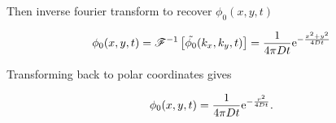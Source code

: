 Then inverse fourier transform to recover $\phi_0(x,y,t)$

\begin{equation}
  \phi_0(x,y,t) = \mathscr{F}^{-1}\left[\tilde{\phi_0}(k_x,k_y,t)\right] = \frac{1}{4\pi Dt}\mathrm{e}^{-\frac{x^2 + y^2}{4Dt}} \\
\end{equation}

Transforming back to polar coordinates gives

\begin{equation}
  \phi_0(x,y,t) = \frac{1}{4\pi Dt}\mathrm{e}^{-\frac{r^2}{4Dt}} .\\
  \label{eqn:phi_0}
\end{equation}
